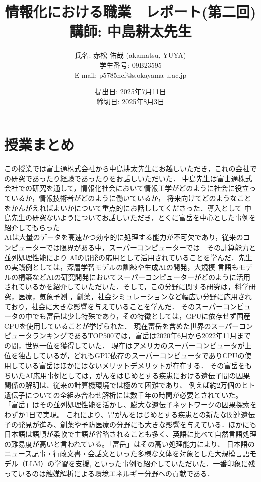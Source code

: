 \documentclass[autodetect-engine,dvi=dvipdfmx,ja=standard,
               a4j,11pt]{bxjsarticle}
\title{{\normalsize 情報化における職業　レポート(第二回)
        \\[1.5ex]
       {\LARGE 講師: 中島耕太先生} \\[1.5ex]}}
\author{氏名: 赤松 佑哉 (akamatsu, YUYA) \\
        学生番号: 09B23595\\
        E-mail: p5785hcf@s.okayama-u.ac.jp}
\date{提出日: 2025年7月11日 \\
      締切日: 2025年8月3日 \\}  %
\begin{document}
\maketitle
\section{授業まとめ}
この授業では富士通株式会社から中島耕太先生にお越しいただき，これの会社での研究であったり経験であったりをお話しいただいた．
中島先生は富士通株式会社での研究を通して，情報化社会において情報工学がどのように社会に役立っているか，情報技術者がどのように働いているか，
将来向けてどのようなことをかんがえればよいかについて重点的にお話ししてくださった．導入として
中島先生の研究ないようについてお話しいただき，とくに富岳を中心とした事例を紹介してもらった\\
AIは大量のデータを高速かつ効率的に処理する能力が不可欠であり，従来のコンピューターでは限界がある中，スーパーコンピューターでは　その計算能力と並列処理性能により
AIの開発の応用として活用されていることを学んだ．先生の実践例としては，深層学習モデルの訓練や生成AIの開発，大規模
言語もモデルの構築などAIの研究開発においてスーパーコンピューターがどのように活用されているかを紹介していただいた．そして，この分野に関する研究は，科学研究，医療，気象予測
，創薬，社会シミュレーションなど幅広い分野に応用されており，社会に大きな影響を与えていることを学んだ．
そのスーパーコンピュータの中でも富岳は少し特殊であり，その特徴としては，GPUに依存せず国産CPUを使用していることが挙げられた．
現在富岳を含めた世界のスーパーコンピュータランキングであるTOP500では，富岳は2020年6月から2022年11月までの間，世界一位を獲得していた．
現在はアメリカのスーパーコンピュータが上位を独占しているが，どれもGPU依存のスーパーコンピュータでありCPUの使用している富岳はほかにはないメリットデメリットが存在する．
その富岳をもちいたAI応用事例としては，がんをはじめとする疾患における遺伝子間の因果関係の解明は、従来の計算機環境では極めて困難であり、
例えば約2万個のヒト遺伝子についての全組み合わせ解析には数千年の時間が必要とされていた。
「富岳」はその並列処理性能を活かし、膨大な遺伝子ネットワークの因果探索をわずか1日で実現。
これにより、胃がんをはじめとする疾患との新たな関連遺伝子の発見が進み、創薬や予防医療の分野にも大きな影響を与えている．ほかにも
日本語は語順が柔軟で主語が省略されることも多く、英語に比べて自然言語処理の難易度が高いと言われている。「富岳」はその高い処理能力により、
日本語のニュース記事・行政文書・会話文といった多様な文体を対象とした大規模言語モデル（LLM）の学習を支援,
といった事例も紹介していただいた．一番印象に残っているのは触媒解析による環境エネルギー分野への貢献である．
\end{document}
